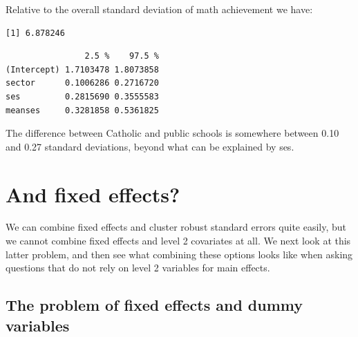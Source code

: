 \documentclass[
  letterpaper,
  DIV=11,
  numbers=noendperiod]{scrreprt}
\newenvironment{Shaded}{\begin{snugshade}}{\end{snugshade}}
\newcommand{\AttributeTok}[1]{\textcolor[rgb]{0.49,0.56,0.16}{#1}}
\newcommand{\FunctionTok}[1]{\textcolor[rgb]{0.02,0.16,0.49}{#1}}
\newcommand{\NormalTok}[1]{\textcolor[rgb]{0.00,0.44,0.13}{#1}}
\newcommand{\OtherTok}[1]{\textcolor[rgb]{0.00,0.44,0.13}{#1}}
\newcommand{\SpecialCharTok}[1]{\textcolor[rgb]{0.25,0.44,0.63}{#1}}
\begin{document}
Relative to the overall standard deviation of math achievement we have:

\begin{Shaded}
\end{Shaded}

\begin{verbatim}
[1] 6.878246
\end{verbatim}

\begin{Shaded}
\end{Shaded}

\begin{verbatim}
                2.5 %    97.5 %
(Intercept) 1.7103478 1.8073858
sector      0.1006286 0.2716720
ses         0.2815690 0.3555583
meanses     0.3281858 0.5361825
\end{verbatim}

The difference between Catholic and public schools is somewhere between
0.10 and 0.27 standard deviations, beyond what can be explained by ses.

\hypertarget{and-fixed-effects}{%
\section{And fixed effects?}\label{and-fixed-effects}}

We can combine fixed effects and cluster robust standard errors quite
easily, but we cannot combine fixed effects and level 2 covariates at
all. We next look at this latter problem, and then see what combining
these options looks like when asking questions that do not rely on level
2 variables for main effects.

\hypertarget{the-problem-of-fixed-effects-and-dummy-variables}{%
\subsection{The problem of fixed effects and dummy
variables}\label{the-problem-of-fixed-effects-and-dummy-variables}}
\end{document}
